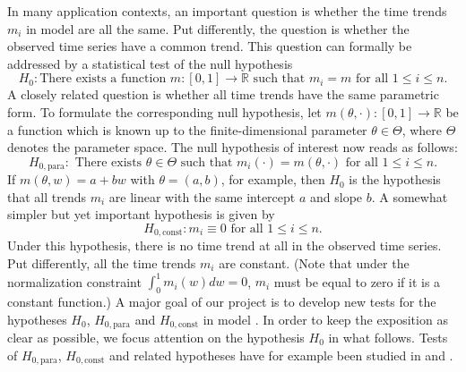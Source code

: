 \documentclass[a4paper,12pt]{article}
\makeatletter
\renewcommand{\eqref}[1]{\tagform@{\ref{#1}}}
\makeatother
\begin{document}
 
\noindent In many application contexts, an important question is whether the time trends $m_i$ in model \eqref{model} are all the same. Put differently, the question is whether the observed time series
have a common trend. This question can formally be addressed by a statistical test of the null hypothesis 
\[ H_0: \text{There exists a function } m: [0,1] \rightarrow \mathbb{R} \text{ such that } m_i = m  \text{ for all } 1 \le i \le n. \]
A closely related question is whether all time trends have the same parametric form. To formulate the corresponding null hypothesis, let $m(\theta,\cdot): [0,1] \rightarrow \mathbb{R}$ be a function which is known up to the finite-dimensional parameter $\theta \in \Theta$, where $\Theta$ denotes the parameter space. The null hypothesis of interest now reads as follows:  
\[ H_{0,\text{para}}: \text{ There exists } \theta \in \Theta \text{ such that } m_i(\cdot) = m(\theta,\cdot) \text{ for all } 1 \le i \le n. \]  
If $m(\theta,w) = a + b w$ with $\theta = (a,b)$, for example, then $H_0$ is the hypothesis that all trends $m_i$ are linear with the same intercept $a$ and slope $b$. A somewhat simpler but yet important hypothesis is given by 
\[ H_{0,\text{const}}: m_i \equiv 0 \text{ for all } 1 \le i \le n. \]
Under this hypothesis, there is no time trend at all in the observed time series. Put differently, all the time trends $m_i$ are constant. (Note that under the normalization constraint $\int_0^1 m_i(w) dw = 0$, $m_i$ must be equal to zero if it is a constant function.) A major goal of our project is to develop new tests for the hypotheses $H_0$, $H_{0,\text{para}}$ and $H_{0,\text{const}}$ in model \eqref{model}. In order to keep the exposition as clear as possible, we focus attention on the hypothesis $H_0$ in what follows. Tests of $H_{0,\text{para}}$, $H_{0,\text{const}}$ and related hypotheses have for example been studied in \cite{Lyubchich2016} and \cite{ChenWu2018}. 
\end{document}
